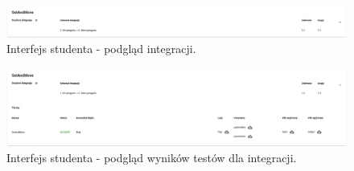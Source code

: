 \begin{figure}[h]
    \centering
    \includegraphics[width = 13cm]{chapter04/student_integration.png}
    \caption{Interfejs studenta - podgląd integracji.}
    \label{fig:student_integration}
\end{figure}

\begin{figure}[h]
    \centering
    \includegraphics[width = 13cm]{chapter04/student_integration_tests.png}
    \caption{Interfejs studenta - podgląd wyników testów dla integracji.}
    \label{fig:student_integration_tests}
\end{figure}